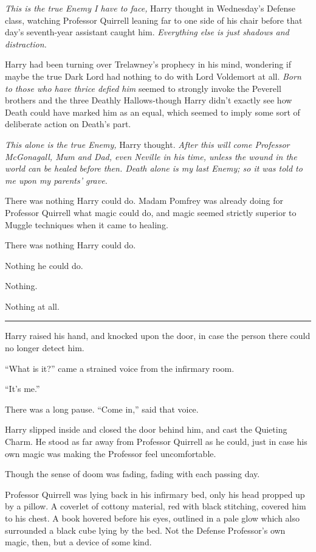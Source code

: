 \emph{This is the true Enemy I have to face,} Harry thought in Wednesday's Defense class, watching Professor Quirrell leaning far to one side of his chair before that day's seventh-year assistant caught him. \emph{Everything else is just shadows and distraction.}

Harry had been turning over Trelawney's prophecy in his mind, wondering if maybe the true Dark Lord had nothing to do with Lord Voldemort at all. \emph{Born to those who have thrice defied him} seemed to strongly invoke the Peverell brothers and the three Deathly Hallows-though Harry didn't exactly see how Death could have marked him as an equal, which seemed to imply some sort of deliberate action on Death's part.

\emph{This alone is the true Enemy,} Harry thought. \emph{After this will come Professor McGonagall, Mum and Dad, even Neville in his time, unless the wound in the world can be healed before then. Death alone is my last Enemy; so it was told to me upon my parents' grave.}

There was nothing Harry could do. Madam Pomfrey was already doing for Professor Quirrell what magic could do, and magic seemed strictly superior to Muggle techniques when it came to healing.

There was nothing Harry could do.

Nothing he could do.

Nothing.

Nothing at all.

\begin{center}\rule{3in}{0.4pt}\end{center}

Harry raised his hand, and knocked upon the door, in case the person there could no longer detect him.

``What is it?'' came a strained voice from the infirmary room.

``It's me.''

There was a long pause. ``Come in,'' said that voice.

Harry slipped inside and closed the door behind him, and cast the Quieting Charm. He stood as far away from Professor Quirrell as he could, just in case his own magic was making the Professor feel uncomfortable.

Though the sense of doom was fading, fading with each passing day.

Professor Quirrell was lying back in his infirmary bed, only his head propped up by a pillow. A coverlet of cottony material, red with black stitching, covered him to his chest. A book hovered before his eyes, outlined in a pale glow which also surrounded a black cube lying by the bed. Not the Defense Professor's own magic, then, but a device of some kind.

